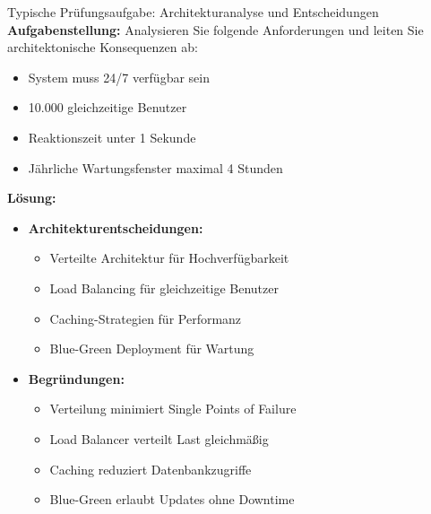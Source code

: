 \begin{example2}{Typische Prüfungsaufgabe: Architekturanalyse und Entscheidungen}\\
\textbf{Aufgabenstellung:}
Analysieren Sie folgende Anforderungen und leiten Sie architektonische Konsequenzen ab:
\begin{itemize}
    \item System muss 24/7 verfügbar sein
    \item 10.000 gleichzeitige Benutzer
    \item Reaktionszeit unter 1 Sekunde
    \item Jährliche Wartungsfenster maximal 4 Stunden
\end{itemize}

\textbf{Lösung:}
\begin{itemize}
    \item \textbf{Architekturentscheidungen:}
    \begin{itemize}
        \item Verteilte Architektur für Hochverfügbarkeit
        \item Load Balancing für gleichzeitige Benutzer
        \item Caching-Strategien für Performanz
        \item Blue-Green Deployment für Wartung
    \end{itemize}
    
    \item \textbf{Begründungen:}
    \begin{itemize}
        \item Verteilung minimiert Single Points of Failure
        \item Load Balancer verteilt Last gleichmäßig
        \item Caching reduziert Datenbankzugriffe
        \item Blue-Green erlaubt Updates ohne Downtime
    \end{itemize}
\end{itemize}
\end{example2}

